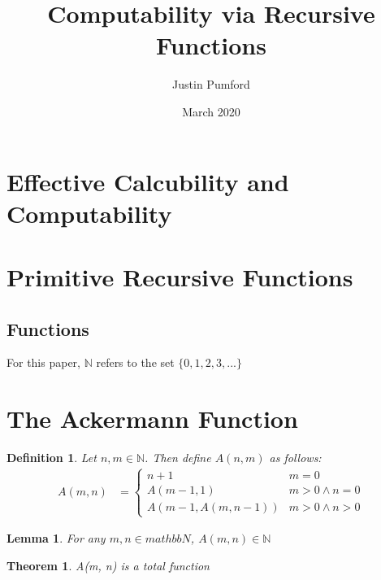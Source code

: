 \documentclass[12pt, letterpaper]{article}
\title{Computability via Recursive Functions}
\author{Justin Pumford  }
\date{March 2020}
\begin{document}
  \maketitle

  \section{Effective Calcubility and Computability}

  \section{Primitive Recursive Functions}
    \subsection{Functions}
      For this paper, $\mathbb{N}$ refers to the set $\{0, 1, 2, 3, ...\}$

  \section{The Ackermann Function}
    \newtheorem*{A}{Definition}
    \begin{A}
      Let $n, m \in \mathbb{N}$. Then define $A(n, m)$ as follows:
      \begin{equation*}
        \begin{aligned}
          A(m, n) &=
          \begin{cases}
            n + 1                   & m = 0 \\
            A(m - 1, 1)             & m > 0 \wedge n = 0 \\
            A(m - 1, A(m, n - 1))   & m > 0 \wedge n > 0
          \end{cases}
        \end{aligned}
      \end{equation*}
    \end{A}

    \newtheorem*{inn}{Lemma}
    \begin{inn}
      For any $m, n \in mathbb{N}$, $A(m, n) \in \mathbb{N}$
    \end{inn}

    \newtheorem*{total}{Theorem}
    \begin{total}
      A(m, n) is a total function
    \end{total}
\end{document}
